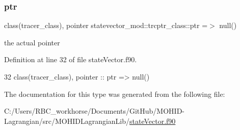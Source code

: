 \subsubsection{\texorpdfstring{ptr}{ptr}}
{\footnotesize\ttfamily class(tracer\+\_\+class), pointer statevector\+\_\+mod\+::trcptr\+\_\+class\+::ptr =$>$ null()\hspace{0.3cm}{\ttfamily [private]}}



the actual pointer 



Definition at line 32 of file state\+Vector.\+f90.


\begin{DoxyCode}
32         \textcolor{keywordtype}{class}(tracer\_class), \textcolor{keywordtype}{pointer} :: ptr => null() 
\end{DoxyCode}


The documentation for this type was generated from the following file\+:\begin{DoxyCompactItemize}
\item 
C\+:/\+Users/\+R\+B\+C\+\_\+workhorse/\+Documents/\+Git\+Hub/\+M\+O\+H\+I\+D-\/\+Lagrangian/src/\+M\+O\+H\+I\+D\+Lagrangian\+Lib/\mbox{\hyperlink{state_vector_8f90}{state\+Vector.\+f90}}\end{DoxyCompactItemize}
